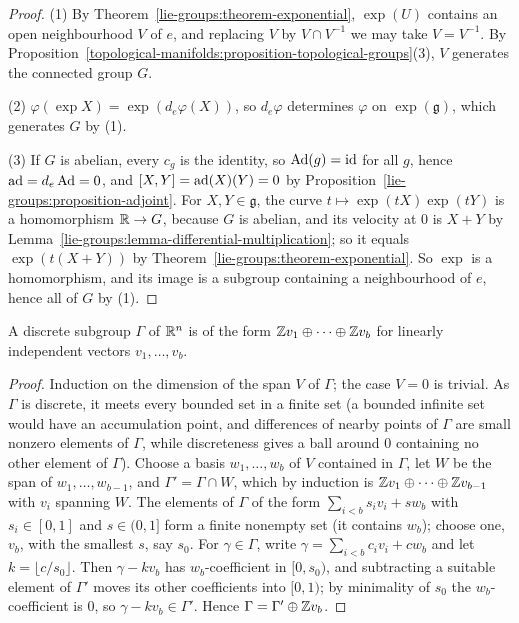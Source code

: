 \begin{proof}
(1) By Theorem~\ref{lie-groups:theorem-exponential}, $\exp(U)$ contains an open neighbourhood $V$ of $e$, and replacing $V$ by $V \cap V^{-1}$ we may take
$V = V^{-1}$. By Proposition~\ref{topological-manifolds:proposition-topological-groups}(3), $V$ generates the connected group $G$.

(2) $\varphi(\exp X) = \exp(d_e\varphi(X))$, so $d_e\varphi$ determines $\varphi$ on $\exp(\mathfrak{g})$, which generates $G$ by (1).

(3) If $G$ is abelian, every $c_g$ is the identity, so $\operatorname{Ad}(g) = \mathrm{id}$ for all $g$, hence $\operatorname{ad} = d_e\operatorname{Ad} = 0$, and $[X, Y] = \operatorname{ad}(X)(Y) = 0$ by
Proposition~\ref{lie-groups:proposition-adjoint}. For $X, Y \in \mathfrak{g}$, the curve $t \mapsto \exp(tX)\exp(tY)$ is a homomorphism $\mathbb{R} \to G$, because $G$ is
abelian, and its velocity at $0$ is $X + Y$ by Lemma~\ref{lie-groups:lemma-differential-multiplication}; so it equals $\exp(t(X + Y))$ by
Theorem~\ref{lie-groups:theorem-exponential}. So $\exp$ is a homomorphism, and its image is a subgroup containing a neighbourhood of $e$, hence all of $G$ by (1).
\end{proof}

\begin{lemma}\label{lie-groups:lemma-discrete-subgroups}
A discrete subgroup $\Gamma$ of $\mathbb{R}^n$ is of the form $\mathbb{Z} v_1 \oplus \cdots \oplus \mathbb{Z} v_b$ for linearly independent vectors $v_1, \ldots, v_b$.
\end{lemma}

\begin{proof}
Induction on the dimension of the span $V$ of $\Gamma$; the case $V = 0$ is trivial. As $\Gamma$ is discrete, it meets every bounded set in a finite set (a bounded infinite set would have an accumulation point, and differences of
nearby points of $\Gamma$ are small nonzero elements of $\Gamma$, while discreteness gives a ball around $0$ containing no other element of $\Gamma$). Choose a basis $w_1, \ldots, w_b$ of $V$ contained in $\Gamma$, let $W$ be the span of
$w_1, \ldots, w_{b-1}$, and $\Gamma' = \Gamma \cap W$, which by induction is $\mathbb{Z} v_1 \oplus \cdots \oplus \mathbb{Z} v_{b-1}$ with $v_i$ spanning $W$. The elements of $\Gamma$ of the form $\sum_{i<b}s_iv_i + sw_b$ with $s_i \in [0, 1]$ and
$s \in (0, 1]$ form a finite nonempty set (it contains $w_b$); choose one, $v_b$, with the smallest $s$, say $s_0$. For $\gamma \in \Gamma$, write $\gamma = \sum_{i<b}c_iv_i + cw_b$ and let $k = \lfloor c/s_0\rfloor$. Then $\gamma - kv_b$ has
$w_b$-coefficient in $[0, s_0)$, and subtracting a suitable element of $\Gamma'$ moves its other coefficients into $[0, 1)$; by minimality of $s_0$ the $w_b$-coefficient is $0$, so $\gamma - kv_b \in \Gamma'$. Hence
$\Gamma = \Gamma' \oplus \mathbb{Z} v_b$.
\end{proof}

